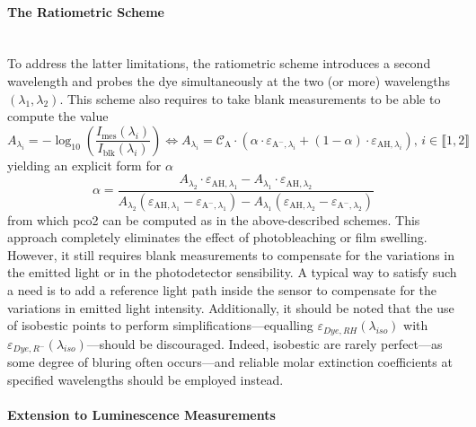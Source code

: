 \paragraph{The Ratiometric Scheme}\label{subsect:choos:dye_based:optical_schemes:ratiometric}\mbox{}\\

To address the latter limitations, the ratiometric scheme introduces a second wavelength and probes the dye simultaneously at the two (or more) wavelengths $(\lambda_1, \lambda_2)$. This scheme also requires to take blank measurements to be able to compute the value
\begin{equation}
	A_{\lambda_i} = - \log_{10}\left( \frac{I_\text{mes}(\lambda_i)}{I_\text{blk}(\lambda_i)}\right) \iff A_{\lambda_i} = \mathcal{C}_\text{A} \cdot \left( \alpha \cdot \varepsilon_{\text{A}^-,\lambda_i} + (1-\alpha) \cdot \varepsilon_{\text{AH},\lambda_i} \right) \text{, }i\in \llbracket 1, 2\rrbracket
\end{equation}
yielding an explicit form for $\alpha$
\begin{equation}
	\alpha = \frac{A_{\lambda_2} \cdot \varepsilon_{\text{AH},\lambda_1} - A_{\lambda_1} \cdot \varepsilon_{\text{AH},\lambda_2}}{A_{\lambda_2} (\varepsilon_{\text{AH},\lambda_1} - \varepsilon_{\text{A}^-,\lambda_1}) - A_{\lambda_1} (\varepsilon_{\text{AH},\lambda_2} - \varepsilon_{\text{A}^-,\lambda_2})}
\end{equation}
from which \gls{pco2} can be computed as in the above-described schemes. This approach completely eliminates the effect of photobleaching or film swelling. However, it still requires blank measurements to compensate for the variations in the emitted light or in the photodetector sensibility. A typical way to satisfy such a need is to add a reference light path inside the sensor to compensate for the variations in emitted light intensity\cite{ge2014}. Additionally, it should be noted that the use of isobestic points to perform simplifications---equalling $\varepsilon_{Dye, RH}(\lambda_{iso})$ with $\varepsilon_{Dye, R^-}(\lambda_{iso})$\cite{lakowicz1993}---should be discouraged. Indeed, isobestic are rarely perfect---as some degree of bluring often occurs\cite{mills2009, segawa2003}---and reliable molar extinction coefficients at specified wavelengths should be employed instead.

\paragraph{Extension to Luminescence Measurements}\mbox{}\\

